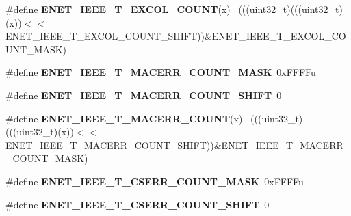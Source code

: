\begin{DoxyCompactItemize}
\item 
\hypertarget{group___e_n_e_t___register___masks_ga38493efaf5266441c45e98afcc16948f}{}\#define {\bfseries E\+N\+E\+T\+\_\+\+I\+E\+E\+E\+\_\+\+T\+\_\+\+E\+X\+C\+O\+L\+\_\+\+C\+O\+U\+N\+T}(x)                          ~(((uint32\+\_\+t)(((uint32\+\_\+t)(x))$<$$<$E\+N\+E\+T\+\_\+\+I\+E\+E\+E\+\_\+\+T\+\_\+\+E\+X\+C\+O\+L\+\_\+\+C\+O\+U\+N\+T\+\_\+\+S\+H\+I\+F\+T))\&E\+N\+E\+T\+\_\+\+I\+E\+E\+E\+\_\+\+T\+\_\+\+E\+X\+C\+O\+L\+\_\+\+C\+O\+U\+N\+T\+\_\+\+M\+A\+S\+K)\label{group___e_n_e_t___register___masks_ga38493efaf5266441c45e98afcc16948f}

\item 
\hypertarget{group___e_n_e_t___register___masks_ga36adf7b60171de45b210bfdec494e6a4}{}\#define {\bfseries E\+N\+E\+T\+\_\+\+I\+E\+E\+E\+\_\+\+T\+\_\+\+M\+A\+C\+E\+R\+R\+\_\+\+C\+O\+U\+N\+T\+\_\+\+M\+A\+S\+K}~0x\+F\+F\+F\+Fu\label{group___e_n_e_t___register___masks_ga36adf7b60171de45b210bfdec494e6a4}

\item 
\hypertarget{group___e_n_e_t___register___masks_ga29ab60c8c05b2a4081ecdafe9cfa8b40}{}\#define {\bfseries E\+N\+E\+T\+\_\+\+I\+E\+E\+E\+\_\+\+T\+\_\+\+M\+A\+C\+E\+R\+R\+\_\+\+C\+O\+U\+N\+T\+\_\+\+S\+H\+I\+F\+T}~0\label{group___e_n_e_t___register___masks_ga29ab60c8c05b2a4081ecdafe9cfa8b40}

\item 
\hypertarget{group___e_n_e_t___register___masks_ga4c57a06a5643fe68f62e98c49984a433}{}\#define {\bfseries E\+N\+E\+T\+\_\+\+I\+E\+E\+E\+\_\+\+T\+\_\+\+M\+A\+C\+E\+R\+R\+\_\+\+C\+O\+U\+N\+T}(x)                        ~(((uint32\+\_\+t)(((uint32\+\_\+t)(x))$<$$<$E\+N\+E\+T\+\_\+\+I\+E\+E\+E\+\_\+\+T\+\_\+\+M\+A\+C\+E\+R\+R\+\_\+\+C\+O\+U\+N\+T\+\_\+\+S\+H\+I\+F\+T))\&E\+N\+E\+T\+\_\+\+I\+E\+E\+E\+\_\+\+T\+\_\+\+M\+A\+C\+E\+R\+R\+\_\+\+C\+O\+U\+N\+T\+\_\+\+M\+A\+S\+K)\label{group___e_n_e_t___register___masks_ga4c57a06a5643fe68f62e98c49984a433}

\item 
\hypertarget{group___e_n_e_t___register___masks_gaa0672cfe66f04b84789c73a1eeb66ade}{}\#define {\bfseries E\+N\+E\+T\+\_\+\+I\+E\+E\+E\+\_\+\+T\+\_\+\+C\+S\+E\+R\+R\+\_\+\+C\+O\+U\+N\+T\+\_\+\+M\+A\+S\+K}~0x\+F\+F\+F\+Fu\label{group___e_n_e_t___register___masks_gaa0672cfe66f04b84789c73a1eeb66ade}

\item 
\hypertarget{group___e_n_e_t___register___masks_gad924e12885d92c79e4ef3ec41026f929}{}\#define {\bfseries E\+N\+E\+T\+\_\+\+I\+E\+E\+E\+\_\+\+T\+\_\+\+C\+S\+E\+R\+R\+\_\+\+C\+O\+U\+N\+T\+\_\+\+S\+H\+I\+F\+T}~0\label{group___e_n_e_t___register___masks_gad924e12885d92c79e4ef3ec41026f929}


\end{DoxyCompactItemize}
